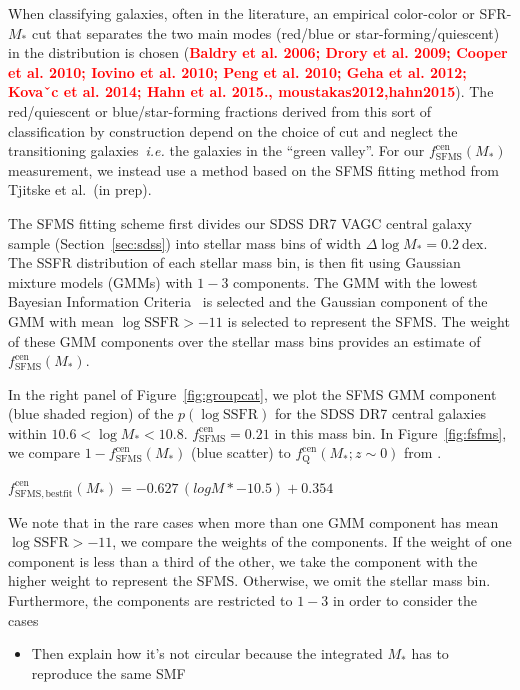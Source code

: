 \documentclass[12pt, letterpaper, preprint]{aastex}
\newcommand{\todo}[1]{{\bf \textcolor{red}{#1}}}
\newcommand{\bitem}{\begin{itemize}}
\newcommand{\eitem}{\end{itemize}}
\begin{document}
When classifying galaxies, often in the literature, an empirical color-color
or SFR-$M_*$ cut that separates the two main modes (red/blue or 
star-forming/quiescent) in the distribution is chosen 
(\todo{Baldry et al. 2006; Drory et al. 2009; Cooper et al. 2010; Iovino et al. 2010; Peng et al. 2010; Geha et al. 2012; Kovaˇc et al. 2014; Hahn et al. 2015., moustakas2012,hahn2015}). 
The red/quiescent or blue/star-forming fractions derived from this sort of 
classification by construction depend on the choice of cut and neglect the 
transitioning galaxies~\emph{i.e.} the galaxies in the ``green valley''. 
For our $f^\mathrm{cen}_\mathrm{SFMS}(M_*)$ measurement, we instead use a 
method based on the SFMS fitting method from Tjitske et al.~(in prep). 

The SFMS fitting scheme first divides our SDSS DR7 VAGC central galaxy 
sample (Section~\ref{sec:sdss}) into stellar mass bins of 
width $\Delta \log M_* = 0.2~\mathrm{dex}$. The SSFR distribution 
of each stellar mass bin, is then fit using Gaussian mixture models (GMMs) 
with $1 - 3$ components. The GMM with the lowest Bayesian Information Criteria~\citep[BIC][]{schwarz1978} 
is selected and the Gaussian component of the GMM with mean $\log \mathrm{SSFR} > -11$
is selected to represent the SFMS. The weight of these GMM components
over the stellar mass bins provides an estimate of  
$f^\mathrm{cen}_\mathrm{SFMS}(M_*)$. 

In the right panel of Figure~\ref{fig:groupcat}, we plot the SFMS GMM component
(blue shaded region) of the $p(\log \mathrm{SSFR})$ for the SDSS DR7 central 
galaxies within $10.6 < \log M_* < 10.8$. $f^\mathrm{cen}_\mathrm{SFMS} = 0.21$ 
in this mass bin. In Figure~\ref{fig:fsfms}, we compare  
$1 - f^\mathrm{cen}_\mathrm{SFMS}(M_*)$ (blue scatter) to 
$f_\mathrm{Q}^\mathrm{cen}(M_*; z\sim0)$ from \cite{hahn2017a}.

$f^\mathrm{cen}_\mathrm{SFMS, bestfit}(M_*) = -0.627\,(log M* - 10.5) + 0.354$


We note that in the rare cases when more than one 
GMM component has mean $\log \mathrm{SSFR} > -11$, we compare the 
weights of the components. If the weight of one component is less than 
a third of the other, we take the component with the higher weight to 
represent the SFMS. Otherwise, we omit the stellar mass bin. 
Furthermore, the components are restricted to $1 - 3$ in order to consider
the cases 


\bitem
\item Then explain how it's not circular because the integrated $M_*$ has to reproduce the same SMF
\eitem
\end{document}
